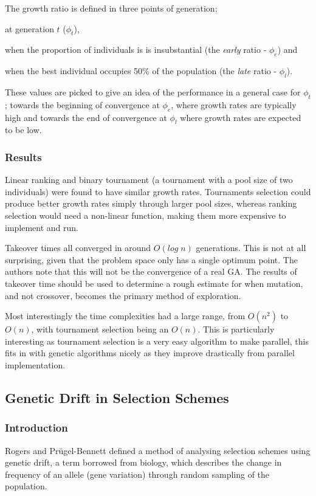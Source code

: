 \documentclass[10pt, a4paper]{article}
\begin{document}
The growth ratio is defined in three points of generation;
\begin{inparaenum}[1\upshape)]
\item at generation $t$ ($\phi_t$),
\item when the proportion of individuals is is insubstantial (the \textit{early}
      ratio - $\phi_e$) and
\item when the best individual occupies 50\% of the population (the
      \textit{late} ratio - $\phi_l$).
\end{inparaenum}

These values are picked to give an idea of the performance in a general case for
$\phi_t$; towards the beginning of convergence at $\phi_e$, where growth rates
are typically high and towards the end of convergence at $\phi_l$ where growth
rates are expected to be low.

\subsubsection{Results} 
Linear ranking and binary tournament (a tournament with a pool size of two
individuals) were found to have similar growth rates. Tournaments selection
could produce better growth rates simply through larger pool sizes, whereas
ranking selection would need a non-linear function, making them more expensive
to implement and run.

Takeover times all converged in around $O(log\;n)$ generations. This is not at
all surprising, given that the problem space only has a single optimum point.
The authors note that this will not be the convergence of a real GA. The results
of takeover time should be used to determine a rough estimate for when mutation,
and not crossover, becomes the primary method of exploration.

Most interestingly the time complexities had a large range, from $O(n^2)$ to 
$O(n)$, with tournament selection being an $O(n)$. This is particularly 
interesting as tournament selection is a very easy algorithm to make parallel,
this fits in with genetic algorithms nicely as they improve drastically from 
parallel implementation.

\subsection{Genetic Drift in Selection Schemes}
\subsubsection{Introduction} 
Rogers and Pr\"{u}gel-Bennett\cite{Rogers1999Genetic} defined a method of 
analysing selection schemes using genetic drift, a term borrowed from biology,
which describes the change in frequency of an allele (gene variation) through
random sampling of the population.
\end{document}
